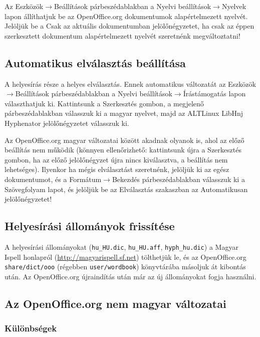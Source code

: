 Az Eszközök$\rightarrow$Beállítások párbeszédablakban a
Nyelvi beállítások$\rightarrow$Nyelvek lapon állíthatjuk be az OpenOffice.org
dokumentumok alapértelmezett nyelvét. Jelöljük be a Csak az aktuális
dokumentumban jelölőnégyzetet, ha csak az éppen szerkesztett
dokumentum alapértelmezett nyelvét szeretnénk megváltoztatni!

\subsection{Automatikus elválasztás beállítása}

A helyesírás része a helyes elválasztás. Ennek automatikus változatát
az Eszközök$\rightarrow$Beállítások párbeszédablakban a
Nyelvi beállítások$\rightarrow$Írástámogatás lapon választhatjuk ki.
Kattintsunk a Szerkesztés gombon, a megjelenő párbeszédablakban válasszuk ki
a magyar nyelvet, majd az ALTLinux LibHnj Hyphenator jelölőnégyzetet
válasszuk ki.

Az OpenOffice.org magyar változatai között akadnak olyanok is, ahol az
előző beállítás nem működik (könnyen ellenőrizhető: kattintsunk
újra a Szerkesztés gombon, ha az előző jelölőnégyzet újra
nincs kiválasztva, a beállítás nem lehetséges). Ilyenkor ha mégis
elválasztást szeretnénk, jelöljük ki az egész dokumentumot,
és a Formátum$\rightarrow$Bekezdés
párbeszédablakban válasszuk ki a Szövegfolyam lapot, és jelöljük
be az Elválasztás szakaszban az Automatikusan jelölőnégyzetet!

\subsection{Helyesírási állományok frissítése}

A helyesírási állományokat (\verb+hu_HU.dic+, \verb+hu_HU.aff+,
\verb+hyph_hu.dic+) a Magyar Ispell honlapról
(\url{http://magyarispell.sf.net}) tölthetjük le, és az OpenOffice.org
\texttt{share/dict/ooo} (régebben \texttt{user/wordbook}) könyvtárába
másoljuk át kibontás után. Az OpenOffice.org újraindítás
után már az új állományokat fogja használni.


\subsection{Az OpenOffice.org nem magyar változatai}

\subsubsection{Különbségek}


